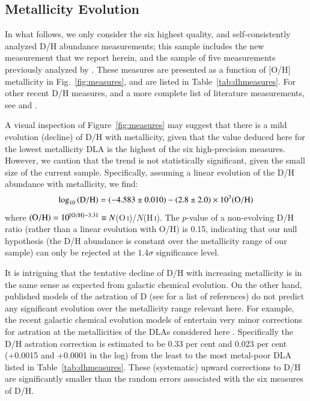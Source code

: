 \documentclass[12pt,preprint,useAMS,usenatbib]{emulateapj}
\newcommand{\HI}{\textrm{H}\,\textsc{i}}
\newcommand{\OI}{O\,\textsc{i}}
\begin{document}
\subsection{Metallicity Evolution}



In what follows, we only consider the six highest quality, and self-consistently
analyzed D/H abundance measurements; this sample includes the new
measurement that we report herein, and the sample of five measurements
previously analyzed by \citet{Coo14}. These measures are presented as
a function of [O/H] metallicity in Fig.~\ref{fig:measures}, and are listed in
Table~\ref{tab:dhmeasures}. For other recent D/H measures,
and a more complete list of literature measurements, see \cite{Rie15} and \citet{Bal15}.

A visual inspection of Figure~\ref{fig:measures} may suggest that
there is a mild evolution (decline) of D/H with metallicity, given that
the value deduced here for the lowest metallicity DLA is the highest
of the six high-precision measures. However, we caution that the
trend is not statistically significant, given the small size of the
current sample. Specifically, assuming a linear evolution of
the D/H abundance with metallicity, we find:
\begin{equation}
\label{eqn:linearevol}
\log_{10}\,({\rm D/H}) = (-4.583\pm0.010) - (2.8\pm2.0)\times10^{3}({\rm O/H})
\end{equation}
where ${\rm (O/H)}=10^{\rm [O/H]-3.31}\equiv N$(\OI)/$N$(\HI).
The $p$-value of a non-evolving D/H ratio (rather
than a linear evolution with O/H) is 0.15, indicating
that our null hypothesis (the D/H abundance is
constant over the metallicity range of our sample)
can only be rejected at the $1.4 \sigma$ significance
level.

It is intriguing that the tentative decline of D/H with
increasing metallicity is in the same sense as expected
from galactic chemical evolution. On the other hand,
published models of the astration of D
(see \citealt{Cyb15} for a list of references) do
not predict any significant evolution over the metallicity
range relevant here.
For example, the recent galactic chemical evolution models
of \citet{Wei16} entertain very minor corrections for astration
at the metallicities of the DLAs considered here
\citep[see also][]{Rom06,Dvo16}. Specifically the
D/H astration correction is estimated to be 0.33 per cent
and 0.023 per cent (+0.0015 and +0.0001 in the log) from
the least to the most metal-poor DLA listed in Table~\ref{tab:dhmeasures}.
These (systematic) upward corrections to D/H are
significantly smaller than the random errors
associated with the six measures of D/H.
\end{document}
